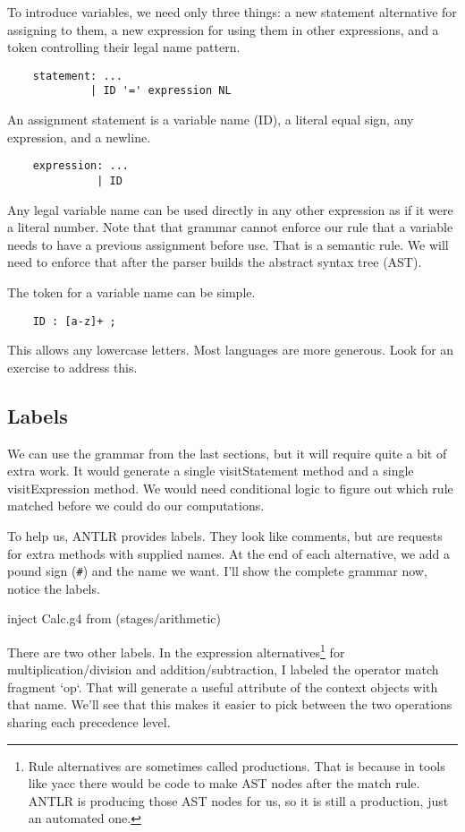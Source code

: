 To introduce variables, we need only three things: a new statement
alternative for assigning to them, a new expression for using them
in other expressions, and a token controlling their legal name pattern.

{\footnotesize
\begin{verbatim}
    statement: ...
             | ID '=' expression NL
\end{verbatim}
}

An assignment statement is a variable name (ID), a literal equal sign,
any expression, and a newline.

{\footnotesize
\begin{verbatim}
    expression: ...
              | ID
\end{verbatim}
}

Any legal variable name can be used directly in any other expression
as if it were a literal number. Note that that grammar cannot enforce
our rule that a variable needs to have a previous assignment before use.
That is a semantic rule. We will need to enforce that after the parser
builds the abstract syntax tree (AST).

The token for a variable name can be simple.

{\footnotesize
\begin{verbatim}
    ID : [a-z]+ ;
\end{verbatim}
}

This allows any lowercase letters. Most languages are more generous.
Look for an exercise to address this.

\subsection{Labels}

We can use the grammar from the last sections, but it will require
quite a bit of extra work. It would generate a single visitStatement
method and a single visitExpression method. We would need conditional
logic to figure out which rule matched before we could do our computations.

To help us, ANTLR provides labels. They look like comments, but
are requests for extra methods with supplied names. At the end of
each alternative, we add a pound sign (\verb+#+) and the name we want.
I'll show the complete grammar now, notice the labels.

inject Calc.g4 from (stages/arithmetic)

There are two other labels. In the expression
alternatives\footnote{Rule alternatives are sometimes called productions.
That is because in tools like yacc there would be code to make AST nodes
after the match rule. ANTLR is producing those AST nodes for us, so it
is still a production, just an automated one.} for multiplication/division
and addition/subtraction, I labeled the operator match fragment `op`.
That will generate a useful attribute of the context objects with that
name. We'll see that this makes it easier to pick between the two
operations sharing each precedence level.

